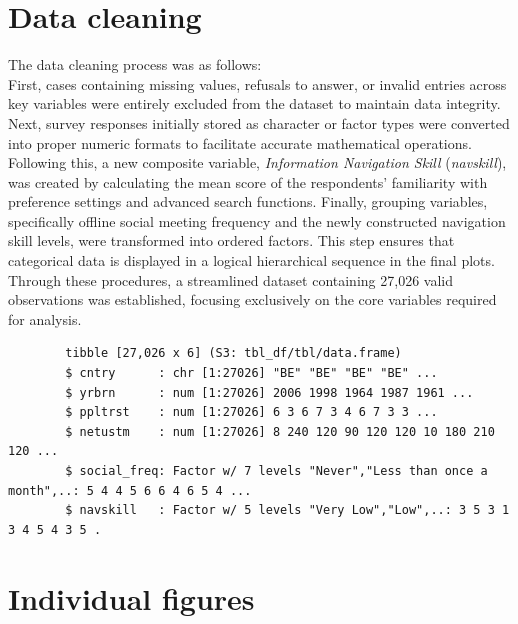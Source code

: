\documentclass[12pt,letterpaper]{article}
\begin{document}
	\section*{Data cleaning}
	The data cleaning process was as follows:\\
	First, cases containing missing values, refusals to answer, or invalid entries across key variables were entirely excluded from the dataset to maintain data integrity. Next, survey responses initially stored as character or factor types were converted into proper numeric formats to facilitate accurate mathematical operations. Following this, a new composite variable, \textit{Information Navigation Skill} (\textit{navskill}), was created by calculating the mean score of the respondents' familiarity with preference settings and advanced search functions. Finally, grouping variables, specifically offline social meeting frequency and the newly constructed navigation skill levels, were transformed into ordered factors. This step ensures that categorical data is displayed in a logical hierarchical sequence in the final plots. Through these procedures, a streamlined dataset containing 27,026 valid observations was established, focusing exclusively on the core variables required for analysis.\\
	
	
	\begin{verbatim}
		tibble [27,026 x 6] (S3: tbl_df/tbl/data.frame)
		$ cntry      : chr [1:27026] "BE" "BE" "BE" "BE" ...
		$ yrbrn      : num [1:27026] 2006 1998 1964 1987 1961 ...
		$ ppltrst    : num [1:27026] 6 3 6 7 3 4 6 7 3 3 ...
		$ netustm    : num [1:27026] 8 240 120 90 120 120 10 180 210 120 ...
		$ social_freq: Factor w/ 7 levels "Never","Less than once a month",..: 5 4 4 5 6 6 4 6 5 4 ...
		$ navskill   : Factor w/ 5 levels "Very Low","Low",..: 3 5 3 1 3 4 5 4 3 5 .
	\end{verbatim} 
	
	\section*{Individual figures}
	
\end{document}
